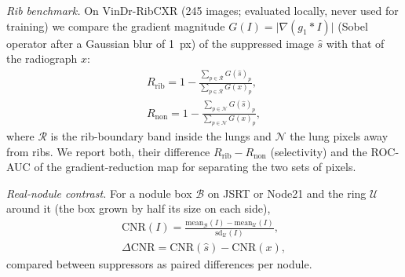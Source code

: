 \emph{Rib benchmark.} On VinDr-RibCXR (245 images; evaluated locally, never used for training) we compare the gradient magnitude
$G(I)=\lvert\nabla(g_{1}*I)\rvert$ (Sobel operator after a Gaussian blur of 1~px) of the suppressed image $\hat s$ with that of the
radiograph $x$:
\begin{equation}
\begin{gathered}
R_{\mathrm{rib}}=1-\frac{\sum_{p\in\mathcal{R}}G(\hat s)_p}{\sum_{p\in\mathcal{R}}G(x)_p},\\
R_{\mathrm{non}}=1-\frac{\sum_{p\in\mathcal{N}}G(\hat s)_p}{\sum_{p\in\mathcal{N}}G(x)_p},
\end{gathered}
\label{eq:rib}
\end{equation}
where $\mathcal{R}$ is the rib-boundary band inside the lungs and $\mathcal{N}$ the lung pixels away from ribs. We report both, their
difference $R_{\mathrm{rib}}-R_{\mathrm{non}}$ (selectivity) and the ROC-AUC of the gradient-reduction map for separating the two sets of
pixels.

\emph{Real-nodule contrast.} For a nodule box $\mathcal{B}$ on JSRT or Node21 and the ring $\mathcal{U}$ around it (the box grown by half
its size on each side),
\begin{equation}
\begin{gathered}
\mathrm{CNR}(I)=\frac{\mathrm{mean}_{\mathcal{B}}(I)-\mathrm{mean}_{\mathcal{U}}(I)}{\mathrm{sd}_{\mathcal{U}}(I)},\\
\Delta\mathrm{CNR}=\mathrm{CNR}(\hat s)-\mathrm{CNR}(x),
\end{gathered}
\label{eq:cnr}
\end{equation}
compared between suppressors as paired differences per nodule.


